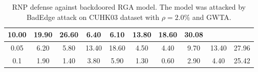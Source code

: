 \begin{table}
{\begin{tabular}{cccccccccc}
  \multicolumn{1}{c|}{10.00} &
  \multicolumn{1}{c|}{19.90} &
  \multicolumn{1}{c|}{26.60} &
  \multicolumn{1}{c|}{6.40} &
  \multicolumn{1}{c|}{6.10} &
  \multicolumn{1}{c|}{13.80} &
  \multicolumn{1}{c|}{18.60} &
  30.08 \\ \hline
\multicolumn{1}{c|}{0.05} &
  \multicolumn{1}{c|}{6.20} &
  \multicolumn{1}{c|}{5.80} &
  \multicolumn{1}{c|}{13.40} &
  \multicolumn{1}{c|}{18.60} &
  \multicolumn{1}{c|}{4.50} &
  \multicolumn{1}{c|}{4.40} &
  \multicolumn{1}{c|}{9.70} &
  \multicolumn{1}{c|}{13.40} &
  27.96 \\ \hline
\multicolumn{1}{c|}{0.1} &
  \multicolumn{1}{c|}{1.90} &
  \multicolumn{1}{c|}{1.40} &
  \multicolumn{1}{c|}{3.80} &
  \multicolumn{1}{c|}{5.90} &
  \multicolumn{1}{c|}{1.30} &
  \multicolumn{1}{c|}{0.60} &
  \multicolumn{1}{c|}{2.90} &
  \multicolumn{1}{c|}{4.40} &
  25.42 \\ \bottomrule
\end{tabular}
}
\caption{
RNP defense against backdoored RGA model. The model was attacked by BadEdge attack on CUHK03 dataset with $\rho=2.0\%$ and GWTA.}
% 
\label{tab:RNP}
\vspace{-0.6cm}
\end{table}